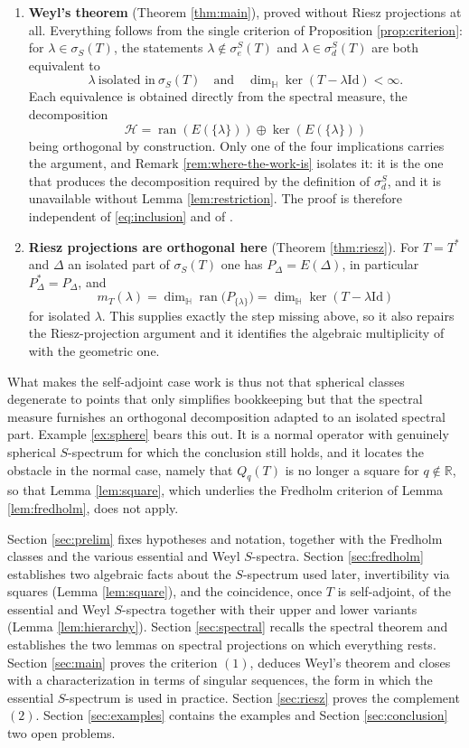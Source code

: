 \documentclass[12pt,a4paper]{article}
\theoremstyle{plain}
\theoremstyle{definition}
\theoremstyle{remark}
\newcommand{\HH}{\mathbb H}
\newcommand{\RR}{\mathbb R}
\newcommand{\Id}{\mathrm{Id}}
\newcommand{\HS}{\mathcal H}
\newcommand{\dimH}{\dim_{\HH}}
\newcommand{\sigS}{\sigma_S}
\newcommand{\sigeS}{\sigma_{e}^{S}}
\newcommand{\sigdS}{\sigma_{d}^{S}}
\DeclareMathOperator{\ran}{ran}
\begin{document}
{\begin{enumerate}
\item \textbf{Weyl's theorem} (Theorem \ref{thm:main}), proved without
Riesz projections at all. Everything follows from the single criterion
of Proposition \ref{prop:criterion}: for $\lambda\in\sigS(T)$, the
statements $\lambda\notin\sigeS(T)$ and $\lambda\in\sigdS(T)$ are
both equivalent to
\[
 \lambda\ \text{isolated in}\ \sigS(T)
 \quad\text{and}\quad
 \dimH\ker(T-\lambda\Id)<\infty .
\]
Each equivalence is obtained directly from the spectral measure, the
decomposition $$\HS=\ran(E(\{\lambda\}))\oplus\ker(E(\{\lambda\}))$$
being orthogonal by construction. Only one of the four implications
carries the argument, and Remark \ref{rem:where-the-work-is} isolates
it: it is the one that produces the decomposition required by the
definition of $\sigdS$, and it is unavailable without Lemma
\ref{lem:restriction}. The proof is therefore independent
of \eqref{eq:inclusion} and of
\cite[Theorem 3.10]{BaloudiBelgacemJeribi2022}.

\item \textbf{Riesz projections are orthogonal here} (Theorem
\ref{thm:riesz}). For $T=T^*$ and $\Delta$ an isolated part of
$\sigS(T)$ one has $P_\Delta=E(\Delta)$, in particular
$P_\Delta^*=P_\Delta$, and
\[
 m_T(\lambda)=\dimH\ran\big(P_{\{\lambda\}}\big)
 =\dimH\ker(T-\lambda\Id)
\]
for isolated $\lambda$. This supplies exactly the step missing above,
so it also repairs the Riesz-projection argument and it identifies
the algebraic multiplicity of \cite{BaloudiBelgacemJeribi2022} with
the geometric one.
\end{enumerate}

What makes the self-adjoint case work is thus not that spherical
classes degenerate to points that only simplifies bookkeeping
but that the spectral measure furnishes an orthogonal
decomposition adapted to an isolated spectral part. Example
\ref{ex:sphere} bears this out. It is a normal operator with genuinely
spherical $S$-spectrum for which the conclusion still holds, and it
locates the obstacle in the normal case, namely that $Q_q(T)$ is no
longer a square for $q\notin\RR$, so that Lemma \ref{lem:square},
which underlies the Fredholm criterion of Lemma \ref{lem:fredholm},
does not apply.

Section \ref{sec:prelim} fixes hypotheses and notation, together with
the Fredholm classes and the various essential and Weyl
$S$-spectra. Section \ref{sec:fredholm} establishes two algebraic
facts about the $S$-spectrum used later, invertibility via squares
(Lemma \ref{lem:square}), and the coincidence, once $T$ is
self-adjoint, of the essential and Weyl $S$-spectra together with
their upper and lower variants (Lemma \ref{lem:hierarchy}). Section
\ref{sec:spectral} recalls the spectral
theorem and establishes the two lemmas on spectral projections on
which everything rests. Section \ref{sec:main} proves the criterion
$(1)$, deduces Weyl's theorem and closes with a characterization in
terms of singular sequences, the form in which the essential
$S$-spectrum is used in practice. Section \ref{sec:riesz} proves the
complement $(2)$. Section \ref{sec:examples} contains the examples and
Section \ref{sec:conclusion} two open problems.

}
\end{document}
